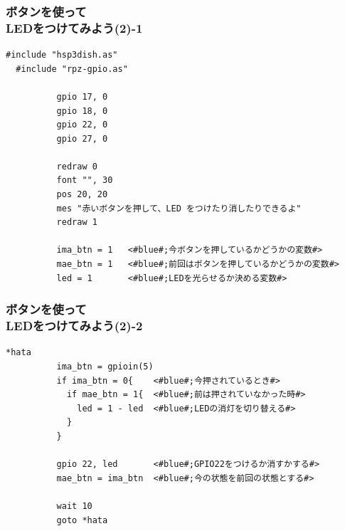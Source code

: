\begin{frame}[fragile]
  \frametitle{ボタンを使って\\LEDをつけてみよう(2)-1}
  \begin{lstlisting}[title=\sim/03/button\_led2.hsp 前半, label=button_led2.hsp-1]
  #include "hsp3dish.as"
  #include "rpz-gpio.as"
  
          gpio 17, 0
          gpio 18, 0
          gpio 22, 0
          gpio 27, 0
        
          redraw 0
          font "", 30
          pos 20, 20
          mes "赤いボタンを押して、LED をつけたり消したりできるよ"
          redraw 1

          ima_btn = 1   <#blue#;今ボタンを押しているかどうかの変数#>
          mae_btn = 1   <#blue#;前回はボタンを押しているかどうかの変数#>
          led = 1       <#blue#;LEDを光らせるか決める変数#>
  \end{lstlisting}
\end{frame}

\begin{frame}[fragile]
  \frametitle{ボタンを使って\\LEDをつけてみよう(2)-2}
  \begin{lstlisting}[title=\sim/03/button\_led2.hsp 後半, label=button_led2.hsp-2]
  *hata
          ima_btn = gpioin(5)
          if ima_btn = 0{    <#blue#;今押されているとき#>
            if mae_btn = 1{  <#blue#;前は押されていなかった時#>
              led = 1 - led  <#blue#;LEDの消灯を切り替える#>
            }
          }

          gpio 22, led       <#blue#;GPIO22をつけるか消すかする#>
          mae_btn = ima_btn  <#blue#;今の状態を前回の状態とする#>

          wait 10
          goto *hata
  \end{lstlisting}
\end{frame}


